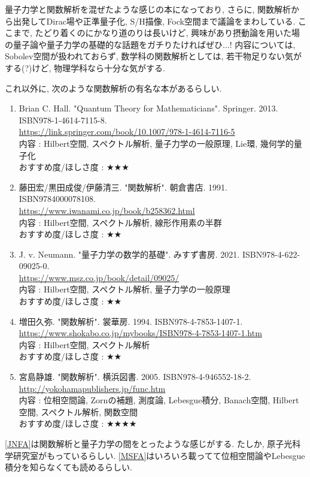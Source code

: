 \documentclass[10pt,a4paper]{jsarticle}
\begin{document}
    量子力学と関数解析を混ぜたような感じの本になっており, さらに, 関数解析から出発してDirac場や正準量子化, S/H描像, Fock空間まで議論をまわしている. ここまで, たどり着くのにかなり道のりは長いけど, 興味があり摂動論を用いた場の量子論や量子力学の基礎的な話題をガチりたければぜひ...! 内容については, Sobolev空間が扱われておらず, 数学科の関数解析としては, 若干物足りない気がする(?)けど, 物理学科なら十分な気がする. \par
    これ以外に, 次のような関数解析の有名な本があるらしい. 
    \begin{enumerate}
        \renewcommand{\theenumi}{[FA\arabic{enumi}]}
        \renewcommand{\labelenumi}{\theenumi}
        \setcounter{enumi}{3}
        \item \label{BHFA} Brian C. Hall. "Quantum Theory for Mathematicians". Springer. 2013. ISBN978-1-4614-7115-8. \\
        \url{https://link.springer.com/book/10.1007/978-1-4614-7116-5} \\
        内容 : Hilbert空間, スペクトル解析, 量子力学の一般原理, Lie環, 幾何学的量子化\\
        おすすめ度/ほしさ度 : $\bigstar \bigstar \bigstar $
        \item \label{FKIFA} 藤田宏/黒田成俊/伊藤清三. "関数解析". 朝倉書店. 1991. ISBN9784000078108. \\
        \url{https://www.iwanami.co.jp/book/b258362.html} \\
        内容 : Hilbert空間, スペクトル解析, 線形作用素の半群\\
        おすすめ度/ほしさ度 : $\bigstar \bigstar $
        \item \label{JNFA} J. v. Neumann. "量子力学の数学的基礎". みすず書房. 	2021. ISBN978-4-622-09025-0. \\
        \url{https://www.msz.co.jp/book/detail/09025/} \\
        内容 : Hilbert空間, スペクトル解析, 量子力学の一般原理\\
        おすすめ度/ほしさ度 : $\bigstar \bigstar $
        \item \label{MHFA} 増田久弥. "関数解析". 裳華房. 1994. ISBN978-4-7853-1407-1. \\
        \url{https://www.shokabo.co.jp/mybooks/ISBN978-4-7853-1407-1.htm} \\
        内容 : Hilbert空間, スペクトル解析\\
        おすすめ度/ほしさ度 : $\bigstar \bigstar $
        \item \label{MSFA} 宮島静雄. "関数解析". 横浜図書. 2005. ISBN978-4-946552-18-2. \\
        \url{http://yokohamapublishers.jp/func.htm} \\
        内容 : 位相空間論, Zornの補題, 測度論, Lebesgue積分, Banach空間, Hilbert空間, スペクトル解析, 関数空間\\
        おすすめ度/ほしさ度 : $\bigstar \bigstar \bigstar \bigstar $
    \end{enumerate}\par 
    \ref{JNFA}は関数解析と量子力学の間をとったような感じがする. たしか, 原子光科学研究室がもっているらしい. \ref{MSFA}はいろいろ載ってて位相空間論やLebesgue積分を知らなくても読めるらしい. 
\end{document}
